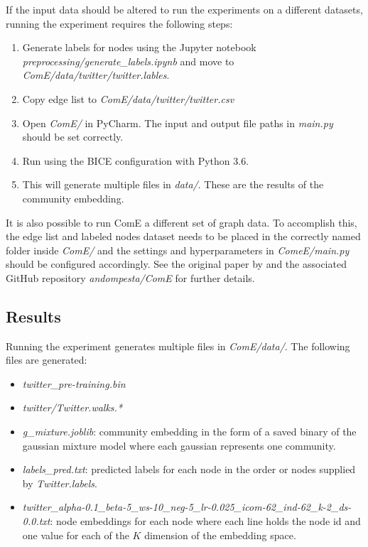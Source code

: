 \documentclass[sigconf]{acmart}
\begin{document}
If the input data should be altered to run the experiments on a different datasets, running the experiment requires the following steps:

\begin{enumerate}
	\item Generate labels for nodes using the Jupyter notebook \textit{preprocessing/generate\_labels.ipynb} and move to \textit{ComE/data/twitter/twitter.lables}.
	\item Copy edge list to \textit{ComE/data/twitter/twitter.csv}
	\item Open \textit{ComE/} in PyCharm. The input and output file paths in \textit{main.py} should be set correctly.
	\item Run using the BICE configuration with Python 3.6.
	\item This will generate multiple files in \textit{data/}. These are the results of the community embedding.
\end{enumerate}

It is also possible to run ComE a different set of graph data. To accomplish this, the edge list and labeled nodes dataset needs to be placed in the correctly named folder inside \textit{ComE/} and the settings and hyperparameters in \textit{ComeE/main.py} should be configured accordingly. See the original paper by \citeauthor{Cav17}\cite{Cav17} and the associated GitHub repository \textit{andompesta/ComE}\cite{ComE} for further details.

\subsection{Results} \label{apply_ComE}

Running the experiment generates multiple files in \textit{ComE/data/}. The following files are generated:
\begin{itemize}
	\item \textit{twitter\_pre-training.bin}
	\item \textit{twitter/Twitter.walks.*}
	\item \textit{g\_mixture.joblib}: community embedding in the form of a saved binary of the gaussian mixture model where each gaussian represents one community.
	\item \textit{labels\_pred.txt}: predicted labels for each node in the order or nodes supplied by \textit{Twitter.labels}.
	\item \textit{twitter\_alpha-0.1\_beta-5\_ws-10\_neg-5\_lr-0.025\_icom-62\_ind-62\_k-2\_ds-0.0.txt}: node embeddings for each node where each line holds the node id and one value for each of the $K$ dimension of the embedding space.
\end{itemize}
\end{document}
